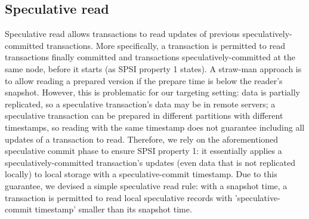 \subsection{Speculative read}
\label{sub:sr}

Speculative read allows transactions to read updates of previous speculatively-committed transactions. More specifically, a transaction is permitted to read transactions finally committed and transactions speculatively-committed at the same node, before it starts (as SPSI property 1 states). A straw-man approach is to allow reading a prepared version if the prepare time is below the reader's snapshot. However, this is problematic for our targeting setting: data is partially replicated, so a speculative transaction's data may be in remote servers; a speculative transaction can be prepared in different partitions with different timestamps, so reading with the same timestamp does not guarantee including all updates of a transaction to read. Therefore, we rely on the aforementioned speculative commit phase to ensure SPSI property 1: it essentially applies a speculatively-committed transaction's updates (even data that is not replicated locally) to local storage with a speculative-commit timestamp. Due to this guarantee, we devised a simple speculative read rule: with a snapshot time, a transaction is permitted to read local speculative records with 'speculative-commit timestamp' smaller than its snapshot time.

